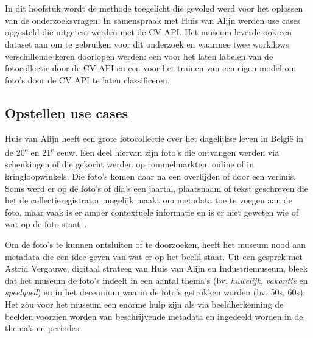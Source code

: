 
\chapter{}
\label{ch:methodologie}

In dit hoofstuk wordt de methode toegelicht die gevolgd werd voor het oplossen van de onderzoeksvragen. In samenspraak met Huis van Alijn werden use cases opgesteld die uitgetest werden met de CV API. Het museum leverde ook een dataset aan om te gebruiken voor dit onderzoek en waarmee twee workflows verschillende keren doorlopen werden: een voor het laten labelen van de fotocollectie door de CV API en een voor het trainen van een eigen model om foto's door de CV API te laten classificeren.

\section{Opstellen use cases}
\label{sec:opstellen-use-cases}

Huis van Alijn heeft een grote fotocollectie over het dagelijkse leven in Belgi\"{e} in de 20\textsuperscript{e} en 21\textsuperscript{e} eeuw. Een deel hiervan zijn foto’s die ontvangen werden via schenkingen of die gekocht werden op rommelmarkten, online of in kringloopwinkels. Die foto's komen daar na een overlijden of door een verhuis. Soms werd er op de foto's of dia's een jaartal, plaatsnaam of tekst geschreven die het de collectieregistrator mogelijk maakt om metadata toe te voegen aan de foto, maar vaak is er amper contextuele informatie en is er niet geweten wie of wat op de foto staat~\autocite{Heemkunde}. 

Om de foto’s te kunnen ontsluiten of te doorzoeken, heeft het museum nood aan metadata die een idee geven van wat er op het beeld staat. Uit een gesprek met Astrid Vergauwe, digitaal strateeg van Huis van Alijn en Industriemuseum, bleek dat het museum de foto’s indeelt in een aantal thema’s (bv. \textit{huwelijk}, \textit{vakantie} en \textit{speelgoed}) en in het decennium waarin de foto’s getrokken worden (bv. 50s, 60s). Het zou voor het museum een enorme hulp zijn als via beeldherkenning de beelden voorzien worden van beschrijvende metadata en ingedeeld worden in de thema’s en periodes.

